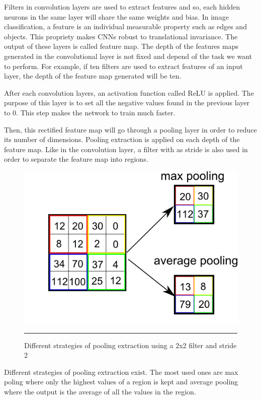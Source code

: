 Filters in convolution layers are used to extract features and so, each hidden neurons in the same layer will share the same weights and bias. In image classification, a feature is an individual measurable property such as edges and objects. This propriety makes CNNs robust to translational invariance. The output of these layers is called feature map. The depth of the features maps generated in the convolutional layer is not fixed and depend of the task we want to perform. For example, if ten filters are used to extract features of an input layer, the depth of the feature map generated will be ten. 

After each convolution layers, an activation function called ReLU is applied. The purpose of this layer is to set all the negative values found in the previous layer to 0. This step makes the network to train much faster.

Then, this rectified feature map will go through a pooling layer in order to reduce its number of dimensions. Pooling extraction is applied on each depth of the feature map. Like in the convolution layer, a filter with as stride is also used in order to separate the feature map into regions.

\begin{figure}[H]
  \centering
    \includegraphics[width=\textwidth]{Figures/pool.png}
    \rule{35em}{0.5pt}
  \caption[Schema of pooling extraction]{Different strategies of pooling extraction using a 2x2 filter and stride 2}
  \label{fig:Muli-layer perceptron}
\end{figure}

Different strategies of pooling extraction exist. The most used ones are max poling where only the highest values of a region is kept and average pooling where the output is the average of all the values in the region. 

